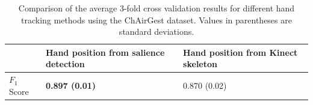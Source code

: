 \begin{table}[h]
\begin{center}
\begin{tabular}{|l|p{5cm}|p{5cm}|}
\hline
 & Hand position from salience detection & Hand position
 from Kinect skeleton \\
\hline
$F_1$ Score & \textbf{0.897 (0.01)} & 0.870 (0.02) \\
\hline
\end{tabular}
\caption{Comparison of the average 3-fold cross validation results for different
hand tracking methods using the ChAirGest dataset. Values in parentheses are
standard deviations.}
\label{tab:comp-tracking}
\end{center}
\end{table}

% 
